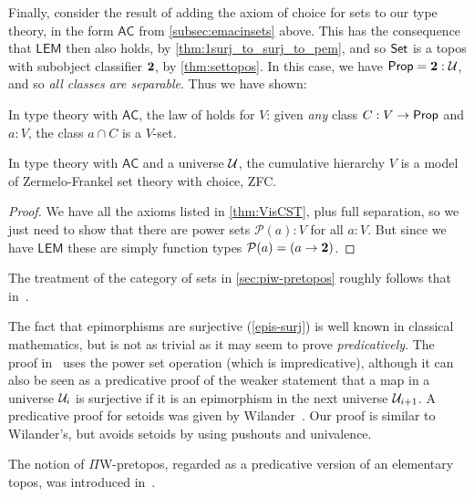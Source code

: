 Finally, consider the result of adding the axiom of choice for sets to our type theory, in the form  $\mathsf{AC}$ from \autoref{subsec:emacinsets} above.  This has the consequence that $\mathsf{LEM}$ then also holds, by \autoref{thm:1surj_to_surj_to_pem}, and so $\mathsf{Set}$ is a topos with subobject classifier $\mathbf{2}$, by \autoref{thm:settopos}.  In this case, we have $\mathsf{Prop} = \mathbf{2}:\mathcal{U}$, and so \emph{all classes are separable}.  Thus we have shown:

\begin{lem}\label{lem:fullsep}
In type theory with $\mathsf{AC}$, the law of  holds for $V$: given \emph{any} class $C : V \to \mathsf{Prop}$ and $a : V$, the class $a \cap C$ is a $V$-set.
\end{lem}

\begin{thm}\label{thm:zfc}
In type theory with $\mathsf{AC}$ and a universe $\mathcal{U}$, the cumulative hierarchy $V$ is a model of Zermelo-Frankel set theory with choice, ZFC.
\end{thm}

\begin{proof}
We have all the axioms listed in \autoref{thm:VisCST}, plus full separation, so we just need to show that there are power sets $\mathcal{P}(a):V$ for all $a:V$.  But since we have $\mathsf{LEM}$ these are simply function types $\mathcal{P}(a) = (a\to\mathbf{2})$.
\end{proof}

\sectionNotes

The treatment of the category of sets in \autoref{sec:piw-pretopos} roughly follows that in~\cite{RijkeSpitters}.

The fact that epimorphisms are surjective (\autoref{epis-surj}) is well known in classical mathematics, but is not as trivial as it may seem to prove \emph{predicatively}.
The proof in~\cite{Mines/R/R:1988} uses the power set operation (which is impredicative), although it can also be seen as a predicative proof of the weaker statement that a map in a universe $\mathcal{U}_i$ is surjective if it is an epimorphism in the next universe $\mathcal{U}_{i+1}$.
A predicative proof for setoids was given by Wilander~\cite{Wilander2010}. 
Our proof is similar to Wilander's, but avoids setoids by using pushouts and univalence.

The notion of $\Pi$W-pretopos, regarded as a predicative version of an elementary topos, was introduced in~\cite{MoerdijkPalmgren2002}.

